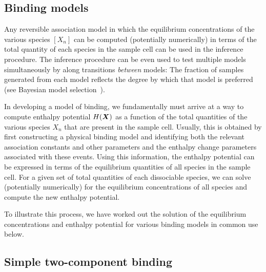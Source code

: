\documentclass[aps,pre,twocolumn,nofootinbib,superscriptaddress,linenumbers]{revtex4-1}
\newcommand{\bfv}[1]{{\mbox{\boldmath{$#1$}}}}
\begin{document}
\begin{widetext}

\section{Binding models}
\label{section:binding-models}

Any reversible association model in which the equilibrium concentrations of the various species $[X_n]$ can be computed (potentially numerically) in terms of the total quantity of each species in the sample cell can be used in the inference procedure.
The inference procedure can be even used to test multiple models simultaneously by along transitions \emph{between} models: The fraction of samples generated from each model reflects the degree by which that model is preferred (see Bayesian model selection~\cite{reference}).

In developing a model of binding, we fundamentally must arrive at a way to compute enthalpy potential $H(\bfv{X})$ as a function of the total quantities of the various species $X_n$ that are present in the sample cell.
Usually, this is obtained by first constructing a physical binding model and identifying both the relevant association constants and other parameters and the enthalpy change parameters associated with these events.
Using this information, the enthalpy potential can be expressed in terms of the equilibrium quantities of all species in the sample cell.
For a given set of total quantities of each dissociable species, we can solve (potentially numerically) for the equilibrium concentrations of all species and compute the new enthalpy potential.

To illustrate this process, we have worked out the solution of the equilibrium concentrations and enthalpy potential for various binding models in common use below.

\subsection{Simple two-component binding}
\label{section:two-component-binding}


\end{widetext}
\end{document}
